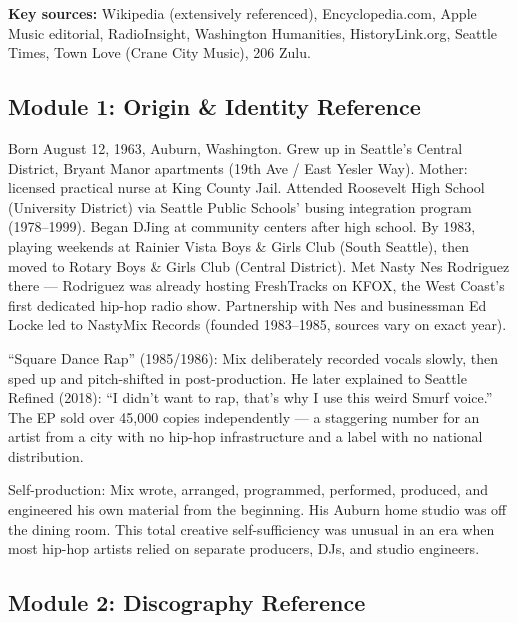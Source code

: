 \documentclass[11pt,letterpaper]{article}
\begin{document}
\textbf{Key sources:} Wikipedia (extensively referenced), Encyclopedia.com, Apple Music editorial, RadioInsight, Washington Humanities, HistoryLink.org, Seattle Times, Town Love (Crane City Music), 206 Zulu.

\subsection{Module 1: Origin \& Identity Reference}

Born August 12, 1963, Auburn, Washington. Grew up in Seattle's Central District, Bryant Manor apartments (19th Ave / East Yesler Way). Mother: licensed practical nurse at King County Jail. Attended Roosevelt High School (University District) via Seattle Public Schools' busing integration program (1978--1999). Began DJing at community centers after high school. By 1983, playing weekends at Rainier Vista Boys \& Girls Club (South Seattle), then moved to Rotary Boys \& Girls Club (Central District). Met Nasty Nes Rodriguez there --- Rodriguez was already hosting FreshTracks on KFOX, the West Coast's first dedicated hip-hop radio show. Partnership with Nes and businessman Ed Locke led to NastyMix Records (founded 1983--1985, sources vary on exact year).

``Square Dance Rap'' (1985/1986): Mix deliberately recorded vocals slowly, then sped up and pitch-shifted in post-production. He later explained to Seattle Refined (2018): ``I didn't want to rap, that's why I use this weird Smurf voice.'' The EP sold over 45,000 copies independently --- a staggering number for an artist from a city with no hip-hop infrastructure and a label with no national distribution.

Self-production: Mix wrote, arranged, programmed, performed, produced, and engineered his own material from the beginning. His Auburn home studio was off the dining room. This total creative self-sufficiency was unusual in an era when most hip-hop artists relied on separate producers, DJs, and studio engineers.

\subsection{Module 2: Discography Reference}
\end{document}
